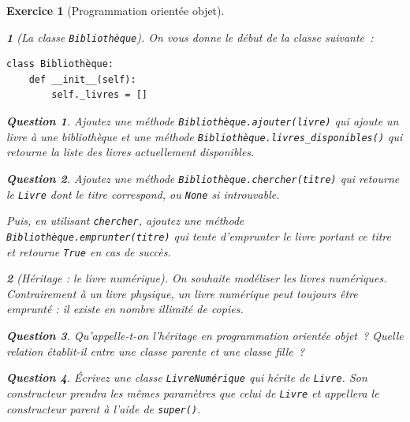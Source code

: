 \documentclass{article}
\theoremstyle{exostyle}
\newtheorem{exo}{Exercice}
\theoremstyle{partiestyle}
\newtheorem{partie}{}[exo]
\theoremstyle{questionstyle}
\newtheorem{questionpartie}{Question}[partie]
\begin{document}
\begin{exo}[Programmation orientée objet]
    \begin{partie}[La classe \texttt{Bibliothèque}]

On vous donne le début de la classe suivante~:

\begin{lstlisting}
class Bibliothèque:
    def __init__(self):
        self._livres = []
\end{lstlisting}

        \begin{questionpartie}
            Ajoutez une méthode \texttt{Bibliothèque.ajouter(livre)} qui ajoute un livre à une bibliothèque et une méthode \texttt{Bibliothèque.livres\_disponibles()} qui retourne la liste des livres actuellement disponibles.
        \end{questionpartie}

        \begin{questionpartie}
            Ajoutez une méthode \texttt{Bibliothèque.chercher(titre)} qui retourne le \texttt{Livre} dont le titre correspond, ou \texttt{None} si introuvable.

            Puis, en utilisant \texttt{chercher}, ajoutez une méthode \texttt{Bibliothèque.emprunter(titre)} qui tente d'emprunter le livre portant ce titre et retourne \texttt{True} en cas de succès.
        \end{questionpartie}

    \end{partie}

    \begin{partie}[Héritage : le livre numérique]

        On souhaite modéliser les livres numériques. Contrairement à un livre physique, un livre numérique peut toujours être emprunté : il existe en nombre illimité de copies.

        \begin{questionpartie}
            Qu'appelle-t-on l'héritage en programmation orientée objet~? Quelle relation établit-il entre une classe parente et une classe fille~?
        \end{questionpartie}

        \begin{questionpartie}
            Écrivez une classe \texttt{LivreNumérique} qui hérite de \texttt{Livre}. Son constructeur prendra les mêmes paramètres que celui de \texttt{Livre} et appellera le constructeur parent à l'aide de \texttt{super()}.
        \end{questionpartie}


\end{partie}
\end{exo}
\end{document}

